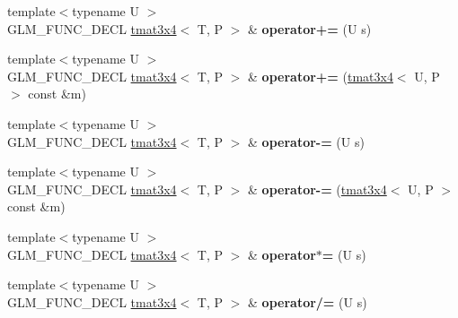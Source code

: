 \begin{DoxyCompactItemize}
\item 
\mbox{\label{structglm_1_1tmat3x4_a1d168f808a356984b260bf15c3ab8e9e}} 
{\footnotesize template$<$typename U $>$ }\\G\+L\+M\+\_\+\+F\+U\+N\+C\+\_\+\+D\+E\+CL \hyperlink{structglm_1_1tmat3x4}{tmat3x4}$<$ T, P $>$ \& {\bfseries operator+=} (U s)
\item 
\mbox{\label{structglm_1_1tmat3x4_abf14c7b0bb58128011f4d0283b95cd8e}} 
{\footnotesize template$<$typename U $>$ }\\G\+L\+M\+\_\+\+F\+U\+N\+C\+\_\+\+D\+E\+CL \hyperlink{structglm_1_1tmat3x4}{tmat3x4}$<$ T, P $>$ \& {\bfseries operator+=} (\hyperlink{structglm_1_1tmat3x4}{tmat3x4}$<$ U, P $>$ const \&m)
\item 
\mbox{\label{structglm_1_1tmat3x4_a42717b0d74b50223515dc81fd6e76d91}} 
{\footnotesize template$<$typename U $>$ }\\G\+L\+M\+\_\+\+F\+U\+N\+C\+\_\+\+D\+E\+CL \hyperlink{structglm_1_1tmat3x4}{tmat3x4}$<$ T, P $>$ \& {\bfseries operator-\/=} (U s)
\item 
\mbox{\label{structglm_1_1tmat3x4_aaf8bc23469dcf8ffbae4ea49c9ced2cd}} 
{\footnotesize template$<$typename U $>$ }\\G\+L\+M\+\_\+\+F\+U\+N\+C\+\_\+\+D\+E\+CL \hyperlink{structglm_1_1tmat3x4}{tmat3x4}$<$ T, P $>$ \& {\bfseries operator-\/=} (\hyperlink{structglm_1_1tmat3x4}{tmat3x4}$<$ U, P $>$ const \&m)
\item 
\mbox{\label{structglm_1_1tmat3x4_aa9925d090bb78d0e96f418f20e6b2104}} 
{\footnotesize template$<$typename U $>$ }\\G\+L\+M\+\_\+\+F\+U\+N\+C\+\_\+\+D\+E\+CL \hyperlink{structglm_1_1tmat3x4}{tmat3x4}$<$ T, P $>$ \& {\bfseries operator$\ast$=} (U s)
\item 
\mbox{\label{structglm_1_1tmat3x4_a378211e46414746911e99ed1499a12bf}} 
{\footnotesize template$<$typename U $>$ }\\G\+L\+M\+\_\+\+F\+U\+N\+C\+\_\+\+D\+E\+CL \hyperlink{structglm_1_1tmat3x4}{tmat3x4}$<$ T, P $>$ \& {\bfseries operator/=} (U s)
\item 
\mbox{\label{structglm_1_1tmat3x4_ac24005ff599f4b6d3110d252c6b173ea}} 

\end{DoxyCompactItemize}

